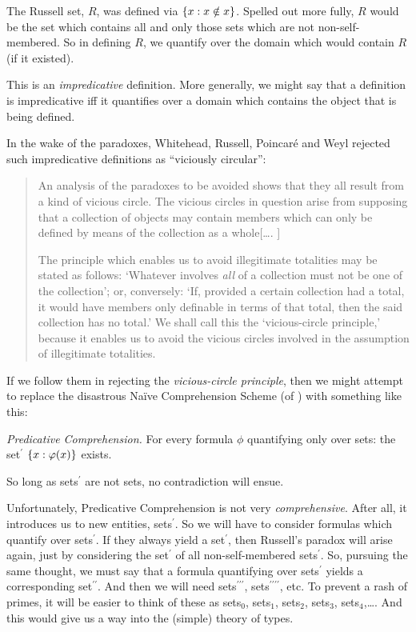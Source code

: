 \documentclass[../../../include/open-logic-section]{subfiles}
\begin{document}


The Russell set, $R$, was defined via $\{ x : x \notin
x \}$. Spelled out more fully, $R$ would be the set which contains all
and only those sets which are not non-self-membered. So in defining
$R$, we quantify over the domain which would contain $R$ (if it
existed).

This is an \emph{impredicative} definition. More generally, we might
say that a definition is impredicative iff it quantifies over a domain
which contains the object that is being defined.  
	
In the wake of the paradoxes, Whitehead, Russell, Poincar\'{e} and
Weyl rejected such impredicative definitions as ``viciously
circular'':
\begin{quote}
	An analysis of the paradoxes to be avoided shows that they all
	result from a kind of vicious circle. The vicious circles in
	question arise from supposing that a collection of objects may
	contain members which can only be defined by means of the
	collection as a whole[\ldots. \textparagraph]

	The principle which enables us to avoid illegitimate totalities
	may be stated as follows: `Whatever involves \emph{all} of a
	collection must not be one of the collection'; or, conversely:
	`If, provided a certain collection had a total, it would have
	members only definable in terms of that total, then the said
	collection has no total.' We shall call this the `vicious-circle
	principle,' because it enables us to avoid the vicious circles
	involved in the assumption of illegitimate totalities.
	\citep[p.~37]{WhiteheadRussell1910}
\end{quote}
If we follow them in rejecting the \emph{vicious-circle principle},
then we might attempt to replace the disastrous Na\"{i}ve
Comprehension Scheme (of ) with something like this: 

\begin{defish}
\emph{Predicative Comprehension.} For every formula $\phi$ quantifying only over sets: the set$^\prime$ $\{ x : \varphi(x) \}$ exists.
\end{defish}

So long as sets$^{\prime}$ are not sets, no contradiction will ensue.  

Unfortunately, Predicative Comprehension is not very
\emph{comprehensive}. After all, it introduces us to new entities,
sets$^\prime$. So we will have to consider formulas which quantify
over sets$^\prime$. If they always yield a set$^\prime$, then
Russell's paradox will arise again, just by considering the
set$^\prime$ of all non-self-membered sets$^\prime$. So, pursuing the
same thought, we must say that a formula quantifying over
sets$^\prime$ yields a corresponding set$^{\prime\prime}$. And then we
will need sets$^{\prime\prime\prime}$,
sets$^{\prime\prime\prime\prime}$, etc. To prevent a rash of primes,
it will be easier to think of these as sets$_0$, sets$_1$, sets$_2$,
sets$_3$, sets$_4$,\ldots. And this would give us a way into the
(simple) theory of types. 
\end{document}
